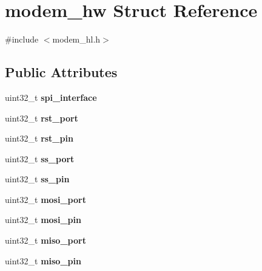 \hypertarget{structmodem__hw}{}\section{modem\+\_\+hw Struct Reference}
\label{structmodem__hw}


{\ttfamily \#include $<$modem\+\_\+hl.\+h$>$}

\subsection*{Public Attributes}
\begin{DoxyCompactItemize}
\item 
\mbox{\label{structmodem__hw_a6d8f5d64b6555936877eef57ffb5c856}} 
uint32\+\_\+t {\bfseries spi\+\_\+interface}
\item 
\mbox{\label{structmodem__hw_a0bb7c8d3d7dfc391f7a0e71961bf638c}} 
uint32\+\_\+t {\bfseries rst\+\_\+port}
\item 
\mbox{\label{structmodem__hw_ad4b38fd1a0568bdbf618c53a966b3e07}} 
uint32\+\_\+t {\bfseries rst\+\_\+pin}
\item 
\mbox{\label{structmodem__hw_aa40e250721b9c488068b09ae87dc8758}} 
uint32\+\_\+t {\bfseries ss\+\_\+port}
\item 
\mbox{\label{structmodem__hw_ae8a8868eee39415e432e93993da93533}} 
uint32\+\_\+t {\bfseries ss\+\_\+pin}
\item 
\mbox{\label{structmodem__hw_ad852ecfdebcaf738620a7589cb6babf2}} 
uint32\+\_\+t {\bfseries mosi\+\_\+port}
\item 
\mbox{\label{structmodem__hw_a47c1622119c4886589f5fbafc7de1d14}} 
uint32\+\_\+t {\bfseries mosi\+\_\+pin}
\item 
\mbox{\label{structmodem__hw_a1f907b69eb4d13d52514824babf9f90a}} 
uint32\+\_\+t {\bfseries miso\+\_\+port}
\item 
\mbox{\label{structmodem__hw_a37db0bdf06fc0ae366b4fc3e48a8e8a9}} 
uint32\+\_\+t {\bfseries miso\+\_\+pin}

\end{DoxyCompactItemize}
